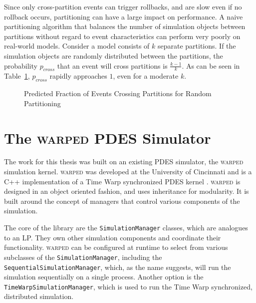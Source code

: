 \documentclass[11pt]{book}
\begin{document}
Since only cross-partition events can trigger rollbacks, and are slow even if no rollback occurs, partitioning can have a large impact on performance. A naive partitioning algorithm that balances the number of simulation objects between partitions without regard to event characteristics can perform very poorly on real-world models. Consider a model consists of \(k\) separate partitions. If the simulation objects are randomly distributed between the partitions, the probability \(p_{cross}\) that an event will cross partitions is \(\frac{k-1}{k}\). As can be seen in Table~\ref{fig:predictedEventCrossings}, \(p_{cross}\) rapidly approaches \(1\), even for a moderate \(k\).

\begin{figure}[h]\label{fig:predictedEventCrossings}
\centering
{}
\caption {Predicted Fraction of Events Crossing Partitions for Random Partitioning}
\end{figure}

\section{The \textsc{warped} PDES Simulator}

The work for this thesis was built on an existing PDES simulator, the \textsc{warped} simulation kernel. \textsc{warped} was developed at the University of Cincinnati and is a C++ implementation of a Time Warp synchronized PDES kernel \cite{king-11}. \textsc{warped} is designed in an object oriented fashion, and uses inheritance for modularity. It is built around the concept of managers that control various components of the simulation.

The core of the library are the \texttt{SimulationManager} classes, which are analogues to an LP. They own other simulation components and coordinate their functionality. \textsc{warped} can be configured at runtime to select from various subclasses of the \texttt{SimulationManager}, including the \texttt{SequentialSimulationManager}, which, as the name suggests, will run the simulation sequentially on a single process. Another option is the \texttt{TimeWarpSimulationManager}, which is used to run the Time Warp synchronized, distributed simulation.
\end{document}
